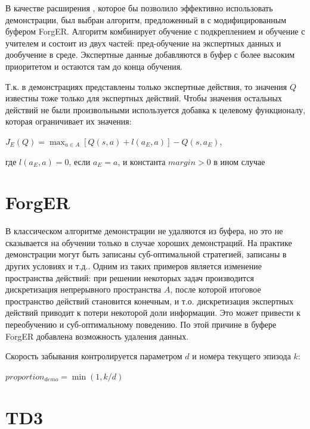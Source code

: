 \documentclass{mipt-thesis-bs}
\begin{document}
В качестве расширения \cite{dqn}, которое бы позволило эффективно использовать демонстрации, был выбран алгоритм, предложенный в \cite{dqfd} с модифицированным буфером ForgER. Алгоритм комбинирует обучение с подкреплением и обучение с учителем и состоит из двух частей: пред-обучение на экспертных данных и дообучение в среде. Экспертные данные добавляются в буфер с более высоким приоритетом и остаются там до конца обучения. 

Т.к. в демонстрациях представлены только экспертные действия, то значения $Q$ известны тоже только для экспертных действий. Чтобы значения остальных действий не были произвольными используется добавка к целевому функционалу, которая ограничивает их значения:

\begin{center}
    $J_{E}(Q)=\max _{a \in A}[Q(s, a)+l(a_{E}, a)]-Q(s, a_{E})$,
    
    где $l(a_{E}, a) = 0$, если $a_{E} = a$, и константа $margin>0$ в ином случае
\end{center}
 
 
\section{ForgER}

В классическом алгоритме демонстрации не удаляются из буфера, но это не сказывается на обучении только в случае хороших демонстраций. На практике демонстрации могут быть записаны суб-оптимальной стратегией, записаны в других условиях и т.д.. Одним из таких примеров является изменение пространства действий: при решении некоторых задач производится дискретизация непрерывного пространства $A$, после которой итоговое пространство действий становится конечным, и т.о. дискретизация экспертных действий приводит к потери некоторой доли информации.  Это может привести к переобучению и суб-оптимальному поведению. По этой причине в буфере ForgER добавлена возможность удаления данных.

Скорость забывания контролируется параметром $d$ и номера текущего эпизода $k$:

\begin{center}
    $proportion_{demo} = \min(1, k/d)$
\end{center}

\section{TD3}
\end{document}
